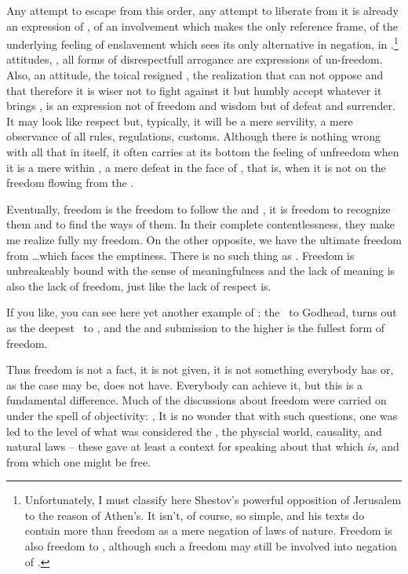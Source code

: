 \pa Any attempt to escape from this order, any attempt to liberate
 from it is already an expression of , of
an involvement which makes  the only reference frame,
of the underlying feeling of enslavement which sees its only
alternative in negation, in .\footnote{Unfortunately,
  I must classify here Shestov's powerful opposition of Jerusalem to
  the reason of Athen's.  It isn't, of course, so simple, and his
  texts do contain more than freedom as a mere negation of laws of
  nature.  Freedom is also freedom to , although such a
  freedom may still be involved into negation of .
}   attitudes, , all forms of disrespectfull
arrogance are expressions of un-freedom.  Also, an 
attitude, the toical resigned , the
realization that  can not oppose  and that
therefore it is wiser not to fight against it but humbly accept
whatever it brings , is an expression not of freedom and wisdom
but of defeat and surrender. It may look like respect but, typically,
it will be a mere servility, a mere observance of all 
rules, regulations, customs.  Although there is nothing wrong with all
that in itself, it often carries at its bottom the feeling of
unfreedom when it is a mere  within , a mere
defeat in the face of , that is, when it is not
 on the freedom flowing from the .

\pa
Eventually, freedom is the freedom to follow the  and 
, it is freedom to recognize them and to find the 
ways of  them. In their complete contentlessness, they 
make me realize fully my freedom. On the other opposite, we have the 
ultimate freedom from \ldots which faces the emptiness. 
There is no such thing as . 
Freedom is unbreakeably bound with the sense of meaningfulness and 
the lack of meaning is also the lack of freedom, just like the lack 
of respect is.


If you like, you can see here yet another example of :
the \yes\ to Godhead, turns out as the deepest \yes\ to , and the  and submission to the higher
 is the fullest form of freedom.

\pa%
Thus freedom is not a fact, it is not given, it is not something everybody 
has or, as the case may be, does not have.
Everybody can achieve it, but this is a fundamental difference. Much 
of the discussions about freedom were carried on under the spell of 
objectivity: ,  It is no wonder that with such 
questions, one was led to the level of what was considered the 
, the physcial world, causality, and natural laws -- these 
gave at least a context for speaking about that which {\em is}, and 
from which one might be free.


